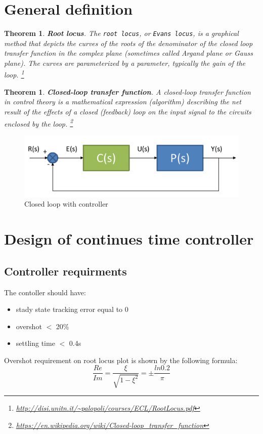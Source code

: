 \documentclass[a4paper,12pt,oneside]{article}
\newtheorem{thm}[equation]{Theorem}
\begin{document}
\section{General definition}

\begin{thm}
\textbf{Root locus}. The \texttt{root locus}, or \texttt{Evans locus}, is a graphical method that
depicts the curves of the roots of the denominator of the closed loop transfer function in the complex plane
(sometimes called Argand plane or Gauss plane). The curves are parameterized by a parameter, typically the
gain of the loop.  \footnote{\url{http://disi.unitn.it/~palopoli/courses/ECL/RootLocus.pdf}}
\end{thm}
\begin{thm}
\textbf{Closed-loop transfer function}. A closed-loop transfer function in control theory is a mathematical expression (algorithm) describing the net result of the effects of a closed (feedback) loop on the input signal to the circuits enclosed by the loop. \footnote{\url{https://en.wikipedia.org/wiki/Closed-loop_transfer_function}}
\end{thm}

\begin{figure}[h]
	\vspace{-1.5em}
	\centering
	\includegraphics[width=\columnwidth]{./closed_loop_controller.png}
	\vspace{-1.5em}
	\caption{Closed loop with controller}
	\label{fig:closed_loop_controller}
	\vspace{-2em}
\end{figure}

\section{Design of continues time controller}
\subsection{Controller requirments}
The contoller should have:
\begin{itemize}
\item stady state tracking error equal to 0
\item overshot $<$ 20\%
\item settling time $<$ 0.4s
\end{itemize}
Overshot requirement on root locus plot is shown by the following formula:
\begin{equation}
\frac{Re}{Im} = \frac{\xi}{\sqrt{1-\xi^{2}}} = \pm\frac{ln{0.2}}{\pi}
\end{equation}
\end{document}
